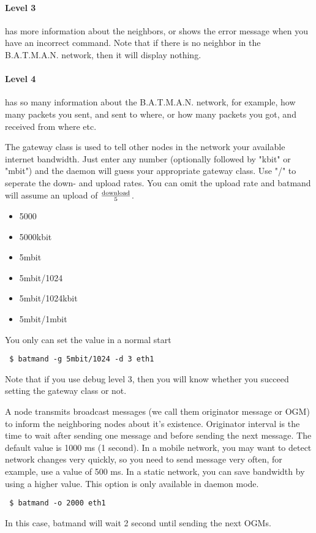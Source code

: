 \paragraph*{Level 3}
has more information about the neighbors, or shows the error message when you
have an incorrect command. Note that if there is no neighbor in the B.A.T.M.A.N.
network, then it will display nothing.

\paragraph*{Level 4}
has so many information about the B.A.T.M.A.N. network, for example, how many
packets you sent, and sent to where, or how many packets you got, and received
from where etc.

The gateway class is used to tell other nodes in the network your available
internet bandwidth. Just enter any number (optionally followed by "kbit" or
"mbit") and the daemon will guess your appropriate gateway class. Use "/" to
seperate the down- and upload rates. You can omit the upload rate and batmand
will assume an upload of $\mathrm{download}\over{5}$.

\begin{itemize}
\item 5000
\item 5000kbit
\item 5mbit
\item 5mbit/1024
\item 5mbit/1024kbit
\item 5mbit/1mbit
\end{itemize}
You only can set the value in a normal start
\begin{verbatim}
 $ batmand -g 5mbit/1024 -d 3 eth1
\end{verbatim}
Note that if you use debug level 3, then you will know whether you succeed
setting the gateway class or not.

A node transmits broadcast messages (we call them originator message or OGM) to
inform the neighboring nodes about it’s existence. Originator interval is the
time to wait after sending one message and before sending the next message.
The default value is 1000 ms (1 second). In a mobile network, you may want to
detect network changes very quickly, so you need to send message very often, for
example, use a value of 500 ms. In a static network, you can save bandwidth by
using a higher value. This option is only available in daemon mode.
\begin{verbatim}
 $ batmand -o 2000 eth1
\end{verbatim}
In this case, batmand will wait 2 second until sending the next OGMs.


